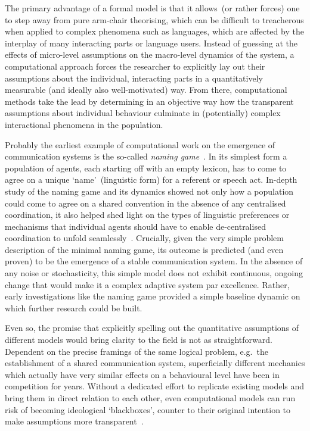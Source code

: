 The primary advantage of a formal model is that it allows~(or rather forces) one to step away from pure arm-chair theorising, which can be difficult to treacherous when applied to complex phenomena such as languages, which are affected by the interplay of many interacting parts or language users. Instead of guessing at the effects of micro-level assumptions on the macro-level dynamics of the system, a computational approach forces the researcher to explicitly lay out their assumptions about the individual, interacting parts in a quantitatively measurable (and ideally also well-motivated) way. From there, computational methods take the lead by determining in an objective way how the transparent assumptions about individual behaviour culminate in (potentially) complex interactional phenomena in the population.

Probably the earliest example of computational work on the emergence of communication systems is the so-called \emph{naming game}~\citep{Steels1998,Steels1999,Baronchelli2006}.
In its simplest form a population of agents, each starting off with an empty lexicon, has to come to agree on a unique `name'~(linguistic form) for a referent or speech act. In-depth study of the naming game and its dynamics showed not only how a population could come to agree on a shared convention in the absence of any centralised coordination, it also helped shed light on the types of linguistic preferences or mechanisms that individual agents should have to enable de-centralised coordination to unfold seamlessly~\citep{DeVylder2006,Wellens2012,Spike2016}. 
Crucially, given the very simple problem description of the minimal naming game, its outcome is predicted (and even proven) to be the emergence of a stable communication system. In the absence of any noise or stochasticity, this simple model does not exhibit continuous, ongoing change that would make it a complex adaptive system par excellence. Rather, early investigations like the naming game provided a simple baseline dynamic on which further research could be built.

Even so, the promise that explicitly spelling out the quantitative assumptions of different models would bring clarity to the field is not as straightforward. Dependent on the precise framings of the same logical problem, e.g.~the establishment of a shared communication system, superficially different mechanics which actually have very similar effects on a behavioural level have been in competition for years. Without a dedicated effort to replicate existing models and bring them in direct relation to each other, even computational models can run risk of becoming ideological `blackboxes', counter to their original intention to make assumptions more transparent~\citep[see][for the exemplary case of proposed pressures]{Spike2016}.


